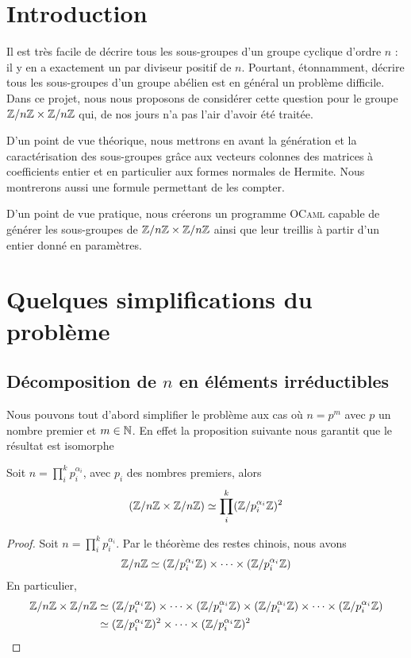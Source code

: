\documentclass[12pt]{article}
\newcommand{\ZnZ}{\Z/n\Z}
\newcommand{\ZZ}{\ZnZ \x \ZnZ}
\begin{document}

\hfill
\thispagestyle{empty}
\newpage
\tableofcontents
\newpage
\section{Introduction}
Il est très facile de décrire tous les sous-groupes d'un groupe cyclique
d'ordre $n$ : il y en a exactement un par diviseur positif de $n$.
Pourtant, étonnamment, décrire tous les sous-groupes d'un groupe abélien
est en général un problème difficile.
Dans ce projet, nous nous proposons de considérer cette question pour le groupe $\ZZ$ qui,
de nos jours n'a pas l'air d'avoir été traitée.

D'un point de vue théorique, nous mettrons en avant la génération et la
caractérisation des sous-groupes grâce aux vecteurs colonnes des matrices à coefficients entier et en particulier
aux formes normales de Hermite. Nous montrerons aussi une formule permettant de les compter.

D'un point de vue pratique, nous créerons un programme \textsc{OCaml} capable de générer les
sous-groupes de $\ZZ$ ainsi que leur treillis à partir d'un entier donné en paramètres.

\newpage
\section{Quelques simplifications du problème}
\subsection{Décomposition de $n$ en éléments irréductibles}\label{theoreme_chinois}

Nous pouvons tout d'abord simplifier le problème aux cas où $n = p^m$ avec $p$ un nombre premier
et $m \in \mathbb N$. En effet la proposition suivante nous garantit que le résultat est isomorphe
\begin{proposition}
	Soit $n = \prod\limits_i^k p_i^{\alpha_i}$, avec $p_i$ des nombres premiers, alors
	$$(\ZZ) \isom \prod_i^k(\Z/p_i^{\alpha_i}\Z)^2$$
\end{proposition}

\begin{proof}
	Soit $n = \prod\limits_i^k p_i^{\alpha_i}$. Par le théorème des restes chinois, nous avons
	$$ \ZnZ \isom (\Z/p_i^{\alpha_i}\Z) \x \cdots \x (\Z/p_i^{\alpha_i}\Z)$$
	En particulier,
	\begin{equation*}
		\begin{split}
			\ZZ & \isom
			(\Z/p_i^{\alpha_i}\Z) \x \cdots \x (\Z/p_i^{\alpha_i}\Z) \x (\Z/p_i^{\alpha_i}\Z)%
			\x \cdots \x (\Z/p_i^{\alpha_i}\Z)\\
			& \isom (\Z/p_i^{\alpha_i}\Z)^2 \x \cdots \x (\Z/p_i^{\alpha_i}\Z)^2
		\end{split}
	\end{equation*}
\end{proof}
\end{document}
